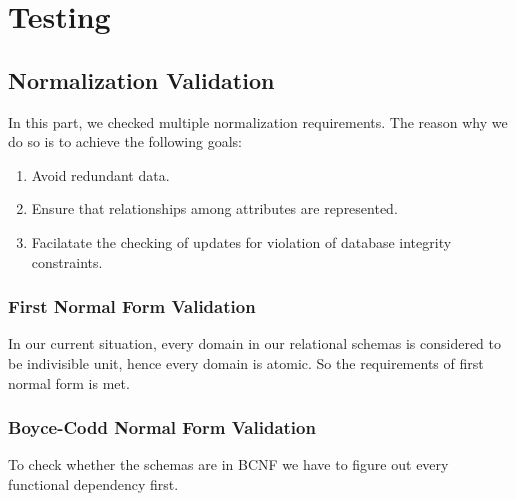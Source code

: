 \documentclass[letter, 12pt]{report}
\begin{document}
	\subsection{}
	
	
	\chapter{Testing}
	
	\section{Normalization Validation}
	In this part, we checked multiple normalization requirements. The reason why we do so is to achieve the following goals:
	\begin{enumerate}
		\item 
		Avoid redundant data.
		\item 
		Ensure that relationships among attributes are represented.
		\item 
		Facilatate the checking of updates for violation of database integrity constraints.
	\end{enumerate}
	\subsection{First Normal Form Validation}
	In our current situation, every domain in our relational schemas is considered to be indivisible unit, hence every domain is atomic. So the requirements of first normal form is met.
	\subsection{Boyce-Codd Normal Form Validation}
	To check whether the schemas are in BCNF we have to figure out every functional dependency first.
\end{document}
